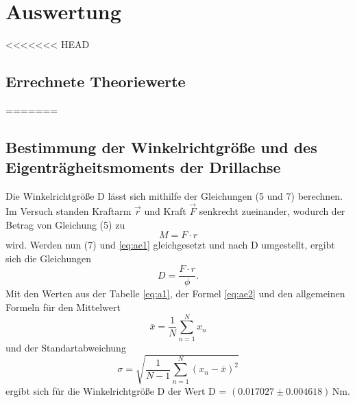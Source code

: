 \section{Auswertung}
\label{sec:Auswertung}

<<<<<<< HEAD
\subsection{Errechnete Theoriewerte}
=======

\subsection{Bestimmung der Winkelrichtgröße und des Eigenträgheitsmoments der Drillachse}

Die Winkelrichtgröße D lässt sich mithilfe der Gleichungen (5 und 7) berechnen. Im Versuch standen 
Kraftarm $\vec{r}$ und Kraft $\vec{F}$ senkrecht zueinander, wodurch der Betrag von Gleichung (5) 
zu
\begin{equation}
    M = F \cdot r
    \label{eq:ae1}
\end{equation}
\noindent
wird. Werden nun (7) und \ref{eq:ae1} gleichgesetzt und nach D umgestellt, ergibt sich die Gleichungen
\begin{equation}
    D = \frac{F\cdot r}{\phi}.
    \label{eq:ae2}
\end{equation}
\noindent
Mit den Werten aus der Tabelle \ref{eq:a1}, der Formel \ref{eq:ae2} und den allgemeinen Formeln für den Mittelwert
\begin{equation}
    \bar{x} = \frac{1}{N} \sum_{n=1}^N x_n 
    \label{eq:ae3}
\end{equation}
\noindent
und der Standartabweichung
\begin{equation}
    \sigma = \sqrt{\frac{1}{N-1} \sum_{n=1}^N (x_n - \bar{x})^2}
\end{equation}
\noindent
ergibt sich für die Winkelrichtgröße D der Wert D = $(0.017027 \pm 0.004618)\,$Nm.

